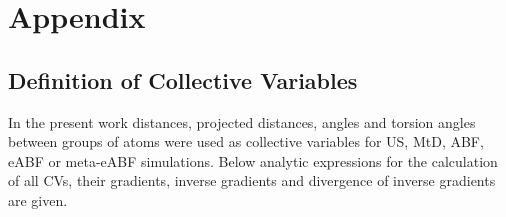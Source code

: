 \chapter{Appendix}
\label{cha:appendix}

\section{Definition of Collective Variables}
\label{sec:reaction coordinates}

In the present work distances, projected distances, angles and torsion angles between groups of atoms were used as collective variables for US, MtD, ABF, eABF or meta-eABF simulations.
Below analytic expressions for the calculation of all CVs, their gradients, inverse gradients and divergence of inverse gradients are given.

